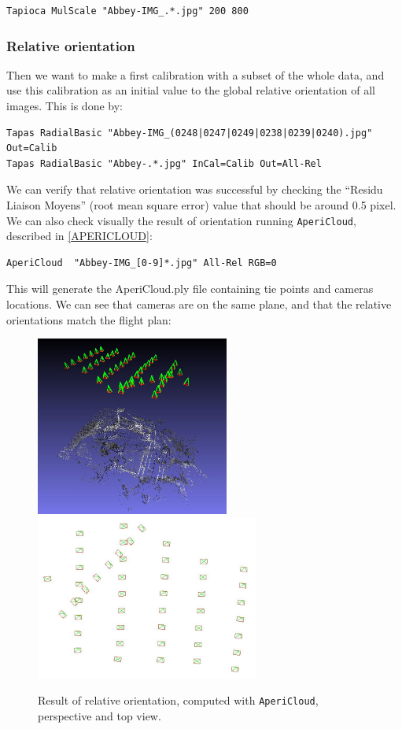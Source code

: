 \begin{verbatim}
Tapioca MulScale "Abbey-IMG_.*.jpg" 200 800
\end{verbatim}

	
\subsubsection{Relative orientation}

Then we want to make a first calibration with a subset of the whole data, and
use this calibration as an initial value to the global relative orientation of all images. This is done by:

\begin{verbatim}
Tapas RadialBasic "Abbey-IMG_(0248|0247|0249|0238|0239|0240).jpg" Out=Calib
Tapas RadialBasic "Abbey-.*.jpg" InCal=Calib Out=All-Rel
\end{verbatim}

We can verify that relative orientation was successful by checking the ``Residu Liaison Moyens'' (root mean square error) value that should be around 0.5 pixel.
We can also check visually the result of orientation running {\tt AperiCloud}, described in \ref{APERICLOUD}: 

\begin{verbatim}
AperiCloud  "Abbey-IMG_[0-9]*.jpg" All-Rel RGB=0
\end{verbatim}

This will generate the AperiCloud.ply file containing tie points and cameras locations. We can see that cameras are on the same plane, and that the relative orientations match the flight
plan:

\begin{figure}[H]
\begin{center}
\includegraphics[width=180pt]{FIGS/Cuxa/AperiCloud.jpg}
\includegraphics[width=208pt]{FIGS/Cuxa/Aero.jpg}
\caption{Result of relative orientation, computed with {\tt AperiCloud}, perspective and top view.}
\end{center}
\end{figure}


